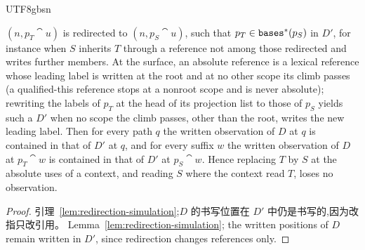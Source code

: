 \begin{CJK*}{UTF8}{gbsn}
\begin{corollary}
$(n, p_T \cat u)$ is redirected to $(n, p_S \cat u)$, such that $p_T \in \mathtt{bases}^*(p_S)$ in $D'$, for
instance when $S$ inherits $T$ through a reference not among those redirected and writes further
members. At the surface, an absolute reference is a lexical reference whose leading label is written at
the root and at no other scope its climb passes (a qualified-this reference stops at a nonroot scope and
is never absolute); rewriting the labels of $p_T$ at the head of its projection list to those of $p_S$
yields such a $D'$ when no scope the climb passes, other than the root, writes the new leading label.
Then for every path $q$ the written observation of $D$ at $q$ is contained in that of $D'$ at $q$, and
for every suffix $w$ the written observation of $D$ at $p_T \cat w$ is contained in that of $D'$ at
$p_S \cat w$. Hence replacing $T$ by $S$ at the absolute uses of a context, and reading $S$ where the
context read $T$, loses no observation.
\fi
\end{corollary}

\begin{proof}
\ifPaperChinese
引理~\ref{lem:redirection-simulation};$D$ 的书写位置在 $D'$ 中仍是书写的,因为改指只改引用。
\else
Lemma~\ref{lem:redirection-simulation}; the written positions of $D$ remain written in $D'$, since
redirection changes references only.
\fi
\end{proof}


\end{CJK*}
